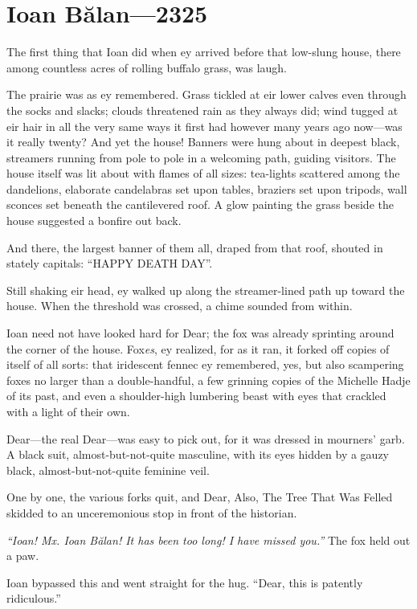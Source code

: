 \hypertarget{ioan-bux103lan-2325}{%
\chapter{Ioan Bălan—2325}\label{ioan-bux103lan-2325}}

The first thing that Ioan did when ey arrived before that low-slung house, there among countless acres of rolling buffalo grass, was laugh.

The prairie was as ey remembered. Grass tickled at eir lower calves even through the socks and slacks; clouds threatened rain as they always did; wind tugged at eir hair in all the very same ways it first had however many years ago now---was it really twenty? And yet the house! Banners were hung about in deepest black, streamers running from pole to pole in a welcoming path, guiding visitors. The house itself was lit about with flames of all sizes: tea-lights scattered among the dandelions, elaborate candelabras set upon tables, braziers set upon tripods, wall sconces set beneath the cantilevered roof. A glow painting the grass beside the house suggested a bonfire out back.

And there, the largest banner of them all, draped from that roof, shouted in stately capitals: ``HAPPY DEATH DAY''.

Still shaking eir head, ey walked up along the streamer-lined path up toward the house. When the threshold was crossed, a chime sounded from within.

Ioan need not have looked hard for Dear; the fox was already sprinting around the corner of the house. Fox\emph{es}, ey realized, for as it ran, it forked off copies of itself of all sorts: that iridescent fennec ey remembered, yes, but also scampering foxes no larger than a double-handful, a few grinning copies of the Michelle Hadje of its past, and even a shoulder-high lumbering beast with eyes that crackled with a light of their own.

Dear---the real Dear---was easy to pick out, for it was dressed in mourners' garb. A black suit, almost-but-not-quite masculine, with its eyes hidden by a gauzy black, almost-but-not-quite feminine veil.

One by one, the various forks quit, and Dear, Also, The Tree That Was Felled skidded to an unceremonious stop in front of the historian.

\emph{``Ioan! Mx. Ioan Bălan! It has been too long! I have missed you.''} The fox held out a paw.

Ioan bypassed this and went straight for the hug. ``Dear, this is patently ridiculous.''

